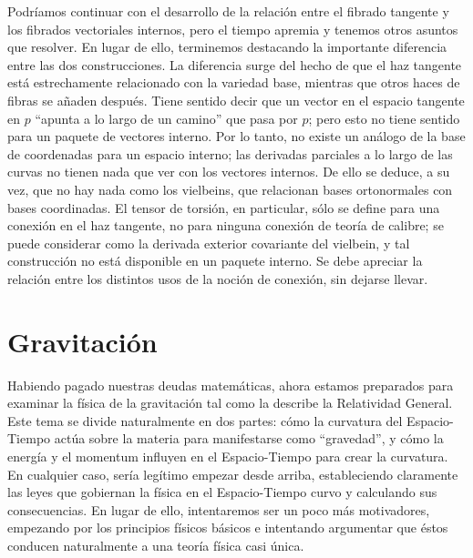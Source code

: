\documentclass[11pt,b5paper,openany,twoside]{book}
\begin{document}
Podríamos continuar con el desarrollo de la relación entre el fibrado tangente y los fibrados vectoriales internos, pero el tiempo apremia y tenemos otros asuntos que resolver.
En lugar de ello, terminemos destacando la importante diferencia entre las dos construcciones.
La diferencia surge del hecho de que el haz tangente está estrechamente relacionado con la variedad base, mientras que otros haces de fibras se añaden después.
Tiene sentido decir que un vector en el espacio tangente en $p$ ``apunta a lo largo de un camino'' que pasa por $p$; pero esto no tiene sentido para un paquete de vectores interno.
Por lo tanto, no existe un análogo de la base de coordenadas para un espacio interno; las derivadas parciales a lo largo de las curvas no tienen nada que ver con los vectores internos.
De ello se deduce, a su vez, que no hay nada como los vielbeins, que relacionan bases ortonormales con bases coordinadas.
El tensor de torsión, en particular, sólo se define para una conexión en el haz tangente, no para ninguna conexión de teoría de calibre; se puede considerar como la derivada exterior covariante del vielbein, y tal construcción no está disponible en un paquete interno.
Se debe apreciar la relación entre los distintos usos de la noción de conexión, sin dejarse llevar.





\chapter{Gravitación}


Habiendo pagado nuestras deudas matemáticas, ahora estamos preparados para examinar la física de la gravitación tal como la describe la Relatividad General.
Este tema se divide naturalmente en dos partes: cómo la curvatura del Espacio-Tiempo actúa sobre la materia para manifestarse como ``gravedad'', y cómo la energía y el momentum influyen en el Espacio-Tiempo para crear la curvatura.
En cualquier caso, sería legítimo empezar desde arriba, estableciendo claramente las leyes que gobiernan la física en el Espacio-Tiempo curvo y calculando sus consecuencias.
En lugar de ello, intentaremos ser un poco más motivadores, empezando por los principios físicos básicos e intentando argumentar que éstos conducen naturalmente a una teoría física casi única.
\end{document}
